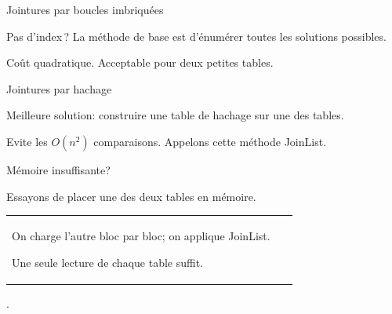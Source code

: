 
\begin{frame}[fragile]{Jointures par boucles imbriquées}

Pas d'index\,? La méthode de base est d'énumérer \alert{toutes}
les solutions possibles.

\vfill



\vfill

\alert{Coût quadratique}. 
Acceptable pour
deux petites tables.
\end{frame}



\begin{frame}[fragile]{Jointures par hachage}

Meilleure solution: construire une table de hachage sur une des tables.

\vfill



\vfill

Evite les $O(n^2)$ comparaisons. Appelons cette méthode \alert{JoinList}.
\end{frame}

\begin{frame}{Mémoire insuffisante?}

Essayons de placer \alert{une} des deux tables en mémoire.

\vfill



\vfill

\begin{tabular}{p{9cm}p{5cm}}

On charge l'autre bloc par bloc; on applique  \alert{JoinList}.

\vfill

Une seule lecture de chaque table suffit.
&
~
\end{tabular}

.

\end{frame}


